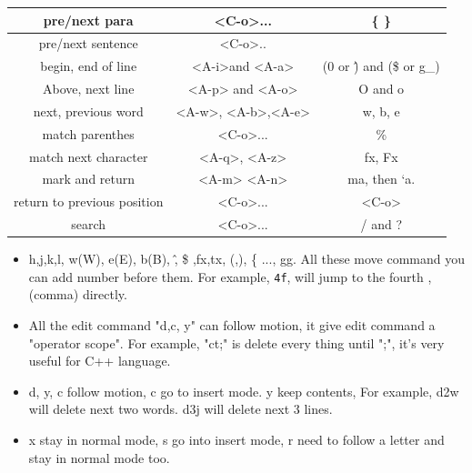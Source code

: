 \documentclass[a4paper,12pt,twoside]{book}
\begin{document}
\begin{itemize}
\begin{center}
\begin{tabular}{c|c|c}
		\hline 
		pre/next para & <C-o>... &\{ \} \\

		\hline 

		pre/next sentence & <C-o>.. & \( \) \\
		
		\hline 
		begin, end of line &<A-i>and <A-a> & (0 or \^) and (\$ or g\_)  \\
		

        \hline 
        Above, next line &<A-p> and <A-o> & O and o\\

	   	\hline 		
	     next, previous word &<A-w>, <A-b>,<A-e>  & w, b, e\\   
		 
         \hline 		
         match parenthes & <C-o>... & \%   \\
         
         \hline match next character &<A-q>, <A-z>& fx, Fx \\
         
        \hline mark and return & <A-m> <A-n> & ma, then `a. \\
        
        \hline return to previous position & <C-o>... & <C-o> \\    
      				
		\hline
        search &<C-o>...  & / and ? \\
       
\end{tabular}
\begin{itemize}


		\item h,j,k,l, w(W), e(E), b(B), \^ , \$ ,fx,tx, (,), \{ ..., gg. All these move command you can add number before them. For example, \verb=4f=, will jump to the fourth ,(comma) directly.    
		

				\item All the edit command "d,c, y" can follow motion, it give edit command a "operator scope". For example, "ct;" is delete every thing until ";", it's very useful for C++ language. 

				\item d, y, c follow motion, c go to insert mode. y keep contents, For example, d2w will delete next two words. d3j will delete next 3 lines.


				\item x stay in normal mode, s go into insert mode, r need to follow a letter and stay in normal mode too.



\end{itemize}
\end{center}
\end{itemize}
\end{document}
